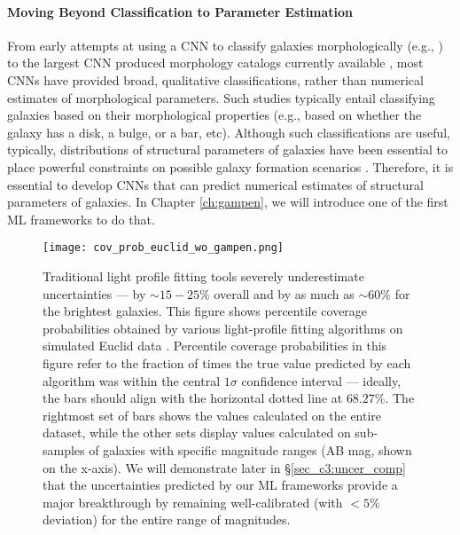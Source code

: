 \paragraph{Moving Beyond Classification to Parameter Estimation} From early attempts at using a CNN to classify galaxies morphologically (e.g.,  \citealp{Dieleman2015Rotation-invariantPrediction}) to the largest CNN produced morphology catalogs currently available \citep{Cheng2021GalaxyNetworks, Vega-Ferrero2021PushingSurvey}, most CNNs have provided broad, qualitative classifications, rather than 
numerical estimates of morphological parameters. Such studies typically entail classifying galaxies based on their morphological properties (e.g., based on whether the galaxy has a disk, a bulge, or a bar, etc). Although such classifications are useful, typically, distributions of structural parameters of galaxies have been essential to place powerful constraints on possible galaxy formation scenarios \citep[e.g.,][]{Kauffmann2004TheGalaxies,Weinmann2006PropertiesMass,Schawinski2007TheGalaxies,vanderWel2008TheMass,Schawinski2014TheGalaxies}. Therefore, it is essential to develop CNNs that can predict numerical estimates of structural parameters of galaxies. In Chapter \ref{ch:gampen}, we will introduce one of the first ML frameworks to do that. 

\begin{figure}[htbp]
    \centering
    \texttt{[image: cov\_prob\_euclid\_wo\_gampen.png]}
    \caption{Traditional light profile fitting tools severely underestimate uncertainties --- by $\sim15-25\%$ overall and by as much as $\sim60\%$ for the brightest galaxies. This figure shows percentile coverage probabilities obtained by various light-profile fitting algorithms on simulated Euclid data \citep[][]{euclid_morph}. Percentile coverage probabilities in this figure refer to the fraction of times the true value predicted by each algorithm was within the central $1\sigma$ confidence interval --- ideally, the bars should align with the horizontal dotted line at $68.27\%$. The rightmost set of bars shows the values calculated on the entire dataset, while the other sets display values calculated on sub-samples of galaxies with specific magnitude ranges (AB mag, shown on the x-axis). We will demonstrate later in \S \ref{sec_c3:uncer_comp} that the uncertainties predicted by our ML frameworks provide a major breakthrough by remaining well-calibrated (with $<5\%$ deviation) for the entire range of magnitudes.}
    \label{fig_intro:uncertainties}
\end{figure}

